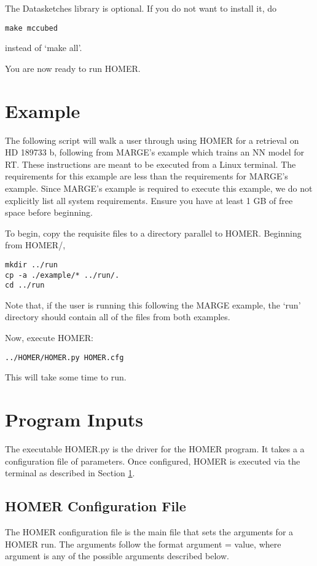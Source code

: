 \documentclass[letterpaper, 12pt]{article}
\begin{document}
\noindent The Datasketches library is optional.  If you do not want to install it, do 
\begin{verbatim}
make mccubed
\end{verbatim}
\noindent instead of `make all'.

\noindent You are now ready to run HOMER.


\section{Example}
\label{sec:example}

The following script will walk a user through using HOMER for a retrieval on 
HD 189733 b, following from MARGE's example which trains an NN model for RT. 
These instructions are meant to be executed from a Linux terminal.  
The requirements for this example are less than the requirements for MARGE's 
example.  Since MARGE's example is required to execute this example, we do 
not explicitly list all system requirements.  Ensure you have at least 1 GB of 
free space before beginning.

\noindent To begin, copy the requisite files to a directory parallel to HOMER. 
Beginning from HOMER/, 
\begin{verbatim}
mkdir ../run
cp -a ./example/* ../run/.
cd ../run
\end{verbatim}
\noindent Note that, if the user is running this following the MARGE example, 
the `run' directory should contain all of the files from both examples.

\noindent Now, execute HOMER:

\begin{verbatim}
../HOMER/HOMER.py HOMER.cfg
\end{verbatim}

\noindent This will take some time to run. 


\section{Program Inputs}
\label{sec:inputs}

The executable HOMER.py is the driver for the HOMER program. It takes a 
a configuration file of parameters.  Once configured, HOMER is executed via 
the terminal as described in Section \ref{sec:example}.


\subsection{HOMER Configuration File}
\label{sec:config}
The HOMER configuration file is the main file that sets the arguments for a 
HOMER run. The arguments follow the format {\ttb argument = value}, where 
{\ttb argument} is any of the possible arguments described below. 
\end{document}
